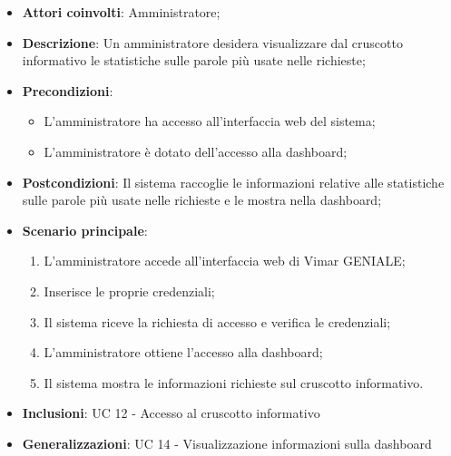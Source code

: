 \begin{itemize}
    \item \textbf{Attori coinvolti}: Amministratore;
    \item \textbf{Descrizione}: Un amministratore desidera visualizzare dal cruscotto informativo le statistiche sulle parole più usate nelle richieste;
    \item \textbf{Precondizioni}: 
        \begin{itemize}
            \item L’amministratore ha accesso all’interfaccia web del sistema;
            \item L’amministratore è dotato dell’accesso alla dashboard;
        \end{itemize}
    \item \textbf{Postcondizioni}: Il sistema raccoglie le informazioni relative alle statistiche sulle parole più usate nelle richieste e le mostra nella dashboard;
    \item \textbf{Scenario principale}:
    \begin{enumerate}
    \item L’amministratore accede all’interfaccia web di Vimar GENIALE;
    \item Inserisce le proprie credenziali;
    \item Il sistema riceve la richiesta di accesso e verifica le credenziali;
    \item L’amministratore ottiene l’accesso alla dashboard;
    \item Il sistema mostra le informazioni richieste sul cruscotto informativo.
    \end{enumerate}
    \item \textbf{Inclusioni}: UC 12 - Accesso al cruscotto informativo
    \item \textbf{Generalizzazioni}: UC 14 - Visualizzazione informazioni sulla dashboard
\end{itemize}


